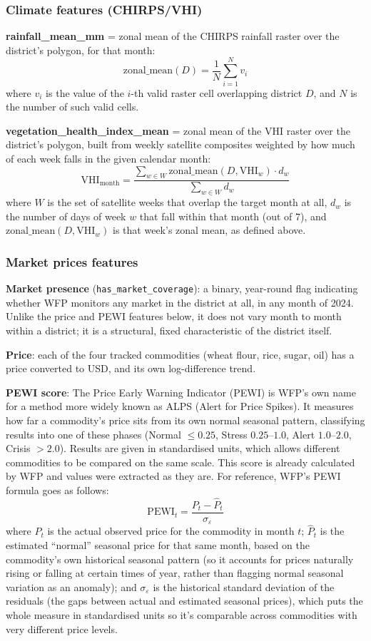 \documentclass[12pt,a4paper]{article}
\begin{document}
\subsubsection{Climate features (CHIRPS/VHI)}

\textbf{rainfall\_mean\_mm} = zonal mean of the CHIRPS rainfall raster over the district's polygon, for that month:
\[
\text{zonal\_mean}(D) = \frac{1}{N}\sum_{i=1}^{N} v_i
\]
where $v_i$ is the value of the $i$-th valid raster cell overlapping district $D$, and $N$ is the number of such valid cells.

\textbf{vegetation\_health\_index\_mean} = zonal mean of the VHI raster over the district's polygon, built from weekly satellite composites weighted by how much of each week falls in the given calendar month:
\[
\text{VHI}_{\text{month}} = \frac{\sum_{w \in W} \text{zonal\_mean}(D, \text{VHI}_w) \cdot d_w}{\sum_{w \in W} d_w}
\]
where $W$ is the set of satellite weeks that overlap the target month at all, $d_w$ is the number of days of week $w$ that fall within that month (out of 7), and $\text{zonal\_mean}(D,\text{VHI}_w)$ is that week's zonal mean, as defined above.

\subsubsection{Market prices features}

\textbf{Market presence} (\texttt{has\_market\_coverage}): a binary, year-round flag indicating whether WFP monitors any market in the district at all, in any month of 2024. Unlike the price and PEWI features below, it does not vary month to month within a district; it is a structural, fixed characteristic of the district itself.

\textbf{Price}: each of the four tracked commodities (wheat flour, rice, sugar, oil) has a price converted to USD, and its own log-difference trend.

\textbf{PEWI score}: The Price Early Warning Indicator (PEWI) is WFP's own name for a method more widely known as ALPS (Alert for Price Spikes). It measures how far a commodity's price sits from its own normal seasonal pattern, classifying results into one of these phases (Normal $\leq 0.25$, Stress $0.25$--$1.0$, Alert $1.0$--$2.0$, Crisis $> 2.0$). Results are given in standardised units, which allows different commodities to be compared on the same scale. This score is already calculated by WFP and values were extracted as they are. For reference, WFP's PEWI formula goes as follows:
\[
\text{PEWI}_t = \frac{P_t - \hat{P}_t}{\sigma_\varepsilon}
\]
where $P_t$ is the actual observed price for the commodity in month $t$; $\hat{P}_t$ is the estimated ``normal'' seasonal price for that same month, based on the commodity's own historical seasonal pattern (so it accounts for prices naturally rising or falling at certain times of year, rather than flagging normal seasonal variation as an anomaly); and $\sigma_\varepsilon$ is the historical standard deviation of the residuals (the gaps between actual and estimated seasonal prices), which puts the whole measure in standardised units so it's comparable across commodities with very different price levels.
\end{document}
